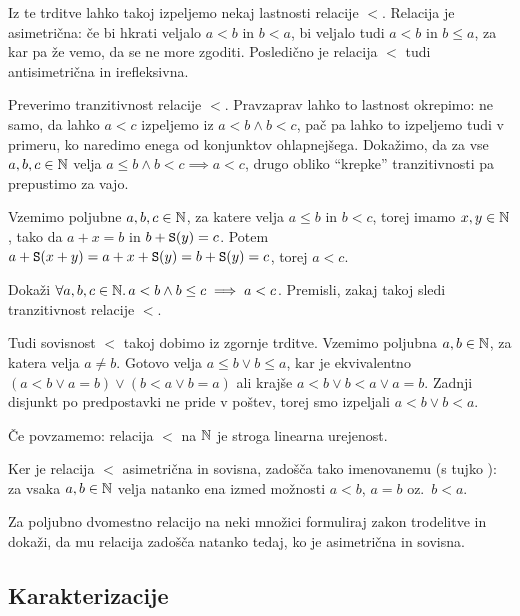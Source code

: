 Iz te trditve lahko takoj izpeljemo nekaj lastnosti relacije $<$. Relacija je asimetrična: če bi hkrati veljalo $a < b$ in $b < a$, bi veljalo tudi $a < b$ in $b \leq a$, za kar pa že vemo, da se ne more zgoditi. Posledično je relacija $<$ tudi antisimetrična in irefleksivna. 

Preverimo tranzitivnost relacije $<$. Pravzaprav lahko to lastnost okrepimo: ne samo, da lahko $a < c$ izpeljemo iz $a < b \land b < c$, pač pa lahko to izpeljemo tudi v primeru, ko naredimo enega od konjunktov ohlapnejšega. Dokažimo, da za vse $a, b, c \in \mathbb{N}$ velja $a \leq b \land b < c \implies a < c$, drugo obliko ``krepke'' tranzitivnosti pa prepustimo za vajo.

Vzemimo poljubne $a, b, c \in \mathbb{N}$, za katere velja $a \leq b$ in $b < c$, torej imamo $x, y \in \mathbb{N}$, tako da $a + x = b$ in $b + \mathtt{S}(y) = c$. Potem $a + \mathtt{S}(x + y) = a + x + \mathtt{S}(y) = b + \mathtt{S}(y) = c$, torej $a < c$.

\begin{vaja}
Dokaži $\forall a, b, c \in \mathbb{N} .\,{a < b \land b \leq c \implies a < c}$. Premisli, zakaj takoj sledi tranzitivnost relacije $<$.
\end{vaja}

Tudi sovisnost $<$ takoj dobimo iz zgornje trditve. Vzemimo poljubna $a, b \in \mathbb{N}$, za katera velja $a \neq b$. Gotovo velja $a \leq b \lor b \leq a$, kar je ekvivalentno $(a < b \lor a = b) \lor (b < a \lor b = a)$ ali krajše $a < b \lor b < a \lor a = b$. Zadnji disjunkt po predpostavki ne pride v poštev, torej smo izpeljali $a < b \lor b < a$.

Če povzamemo: relacija $<$ na $\mathbb{N}$ je stroga linearna urejenost.

Ker je relacija $<$ asimetrična in sovisna, zadošča tako imenovanemu  (s tujko ): za vsaka $a, b \in \mathbb{N}$ velja natanko ena izmed možnosti $a < b$, $a = b$ oz.~$b < a$.

\begin{vaja}
Za poljubno dvomestno relacijo na neki množici formuliraj zakon trodelitve in dokaži, da mu relacija zadošča natanko tedaj, ko je asimetrična in sovisna.
\end{vaja}

\subsection{Karakterizacije}

